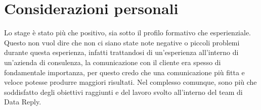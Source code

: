 \section{Considerazioni personali}
Lo stage è stato più che positivo, sia sotto il profilo formativo che esperienziale. Questo non vuol dire che non ci siano state note negative o piccoli problemi durante questa esperienza, infatti trattandosi di un'esperienza all'interno di un'azienda di consulenza, la comunicazione con il cliente era spesso di fondamentale importanza, per questo credo che una comunicazione più fitta e veloce potesse produrre maggiori risultati. 
Nel complesso comunque, sono più che soddisfatto degli obiettivi raggiunti e del lavoro svolto all'interno del team di Data Reply.